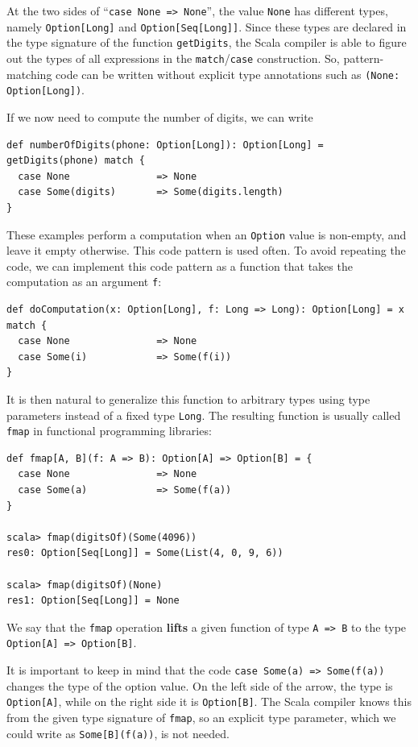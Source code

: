 At the two sides of \textsf{``}\lstinline!case None => None!\textsf{''}, the value
\lstinline!None! has different types, namely \lstinline!Option[Long]!
and \lstinline!Option[Seq[Long]]!. Since these types are declared
in the type signature of the function \lstinline!getDigits!, the
Scala compiler is able to figure out the types of all expressions
in the \lstinline!match!/\lstinline!case! construction. So, pattern-matching
code can be written without explicit type annotations
such as \lstinline!(None: Option[Long])!.

If we now need to compute the number of digits, we can write
\begin{lstlisting}
def numberOfDigits(phone: Option[Long]): Option[Long] = getDigits(phone) match {
  case None               => None
  case Some(digits)       => Some(digits.length)
}
\end{lstlisting}

These examples perform a computation when an \lstinline!Option! value
is non-empty, and leave it empty otherwise. This code pattern is used
often. To avoid repeating the code, we can implement this code pattern
as a function that takes the computation as an argument \lstinline!f!:
\begin{lstlisting}
def doComputation(x: Option[Long], f: Long => Long): Option[Long] = x match {
  case None               => None
  case Some(i)            => Some(f(i))
}
\end{lstlisting}
It is then natural to generalize this function to arbitrary types
using type parameters instead of a fixed type \lstinline!Long!. The
resulting function is usually called \lstinline!fmap! in functional
programming libraries:
\begin{lstlisting}
def fmap[A, B](f: A => B): Option[A] => Option[B] = {
  case None               => None
  case Some(a)            => Some(f(a))
}

scala> fmap(digitsOf)(Some(4096))
res0: Option[Seq[Long]] = Some(List(4, 0, 9, 6))

scala> fmap(digitsOf)(None)
res1: Option[Seq[Long]] = None
\end{lstlisting}
We say that the \lstinline!fmap! operation \textbf{lifts}
a given function of type \lstinline!A => B! to the type \lstinline!Option[A] => Option[B]!. 

It is important to keep in mind that the code \lstinline!case Some(a) => Some(f(a))!
changes the type of the option value. On the left side of the arrow,
the type is \lstinline!Option[A]!, while on the right side it is
\lstinline!Option[B]!. The Scala compiler knows this from the given
type signature of \lstinline!fmap!, so an explicit type parameter,
which we could write as \lstinline!Some[B](f(a))!, is not needed.

